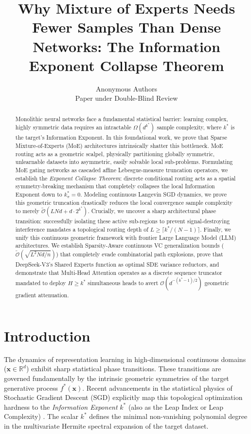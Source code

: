\documentclass{article}
\title{Why Mixture of Experts Needs Fewer Samples Than Dense Networks: The Information Exponent Collapse Theorem}
\author{%
  Anonymous Authors \\
  Paper under Double-Blind Review
}
\newcommand{\R}{\mathbb{R}}
\newcommand{\1}{\mathbb{I}}
\newcommand{\calO}{\mathcal{O}}
\newcommand{\bx}{\mathbf{x}}
\begin{document}
\maketitle

\begin{abstract}
Monolithic neural networks face a fundamental statistical barrier: learning complex, highly symmetric data requires an intractable $\Omega(d^{k^*})$ sample complexity, where $k^*$ is the target's Information Exponent. In this foundational work, we prove that Sparse Mixture-of-Experts (MoE) architectures intrinsically shatter this bottleneck. MoE routing acts as a geometric scalpel, physically partitioning globally symmetric, unlearnable datasets into asymmetric, easily solvable local sub-problems. Formulating MoE gating networks as cascaded affine Lebesgue-measure truncation operators, we establish the \textit{Exponent Collapse Theorem}: discrete conditional routing acts as a spatial symmetry-breaking mechanism that completely collapses the local Information Exponent down to $k_\pi^* = 0$. Modeling continuous Langevin SGD dynamics, we prove this geometric truncation drastically reduces the local convergence sample complexity to merely $\tilde{\calO}(LNd + d \cdot 2^{k^*})$. Crucially, we uncover a sharp architectural phase transition: successfully isolating these active sub-regions to prevent signal-destroying interference mandates a topological routing depth of $L \ge \lceil k^* / (N-1) \rceil$. Finally, we unify this continuous geometric framework with frontier Large Language Model (LLM) architectures. We establish Sparsity-Aware continuous VC generalization bounds ($\tilde{\calO}(\sqrt{L^2Nd/n})$) that completely evade combinatorial path explosions, prove that DeepSeek-V3's Shared Experts function as optimal SDE variance reductors, and demonstrate that Multi-Head Attention operates as a discrete sequence truncator mandated to deploy $H \ge k^*$ simultaneous heads to avert $\calO(d^{-(k^*-1)/2})$ geometric gradient attenuation.
\end{abstract}

\section{Introduction}
\label{sec:intro}

The dynamics of representation learning in high-dimensional continuous domains ($\bx \in \R^d$) exhibit sharp statistical phase transitions. These transitions are governed fundamentally by the intrinsic geometric symmetries of the target generative process $f^*(\bx)$. Recent advancements in the statistical physics of Stochastic Gradient Descent (SGD) explicitly map this topological optimization hardness to the \textit{Information Exponent} $k^*$ (also as the Leap Index or Leap Complexity) \citep{benarous2021online, bietti2022sample, abbe2023sgd}. The scalar $k^*$ defines the minimal non-vanishing polynomial degree in the multivariate Hermite spectral expansion of the target dataset. 
\end{document}
